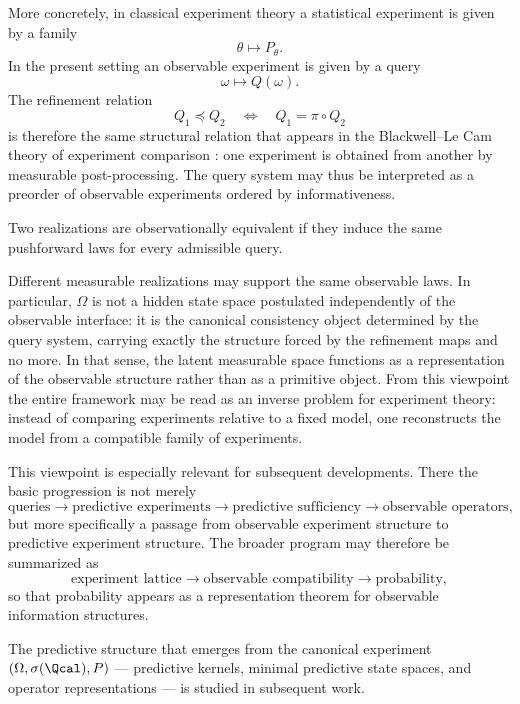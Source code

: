 More concretely, in classical experiment theory a statistical
experiment is given by a family
\[
\theta \mapsto P_\theta .
\]
In the present setting an observable experiment is given by a query
\[
\omega \mapsto Q(\omega).
\]
The refinement relation
\[
Q_1 \preceq Q_2
\quad\Longleftrightarrow\quad
Q_1 = \pi \circ Q_2
\]
is therefore the same structural relation that appears in the
Blackwell--Le Cam theory of experiment comparison \cite{Blackwell,LeCam,Torgersen}: one experiment is
obtained from another by measurable post-processing.  The query system
may thus be interpreted as a preorder of observable experiments
ordered by informativeness.

\begin{definition}
Two realizations are observationally equivalent if they induce the same
pushforward laws for every admissible query.
\end{definition}

Different measurable realizations may support the same observable laws.
In particular, $\Omega$ is not a hidden state space postulated
independently of the observable interface: it is the canonical
consistency object determined by the query system, carrying exactly
the structure forced by the refinement maps and no more.
In that sense, the latent measurable space functions as a representation
of the observable structure rather than as a primitive object.
From this viewpoint the entire framework may be read as an inverse
problem for experiment theory: instead of comparing experiments
relative to a fixed model, one reconstructs the model from a
compatible family of experiments.

This viewpoint is especially relevant for subsequent developments.
There the basic progression is not merely
\[
\text{queries}
\rightarrow
\text{predictive experiments}
\rightarrow
\text{predictive sufficiency}
\rightarrow
\text{observable operators},
\]
but more specifically a passage from observable experiment structure
to predictive experiment structure.  The broader program may therefore
be summarized as
\[
\text{experiment lattice} \rightarrow \text{observable compatibility} \rightarrow \text{probability},
\]
so that probability appears as a representation theorem for observable
information structures.

The predictive structure that emerges from the canonical experiment
$(\Omega,\sigma(\Qcal),P)$ --- predictive kernels, minimal predictive
state spaces, and operator representations --- is studied in subsequent
work.

